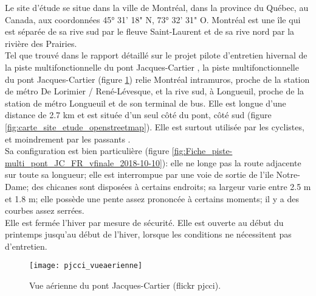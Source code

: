 ﻿\noindent Le site d'étude se situe dans la ville de Montréal, dans la province du Québec, au Canada, aux coordonnées 45° 31' 18" N, 73° 32' 31" O. Montréal est une île qui est séparée de sa rive sud par le fleuve Saint-Laurent et de sa rive nord par la rivière des Prairies.
\vspace{0.5\baselineskip}
\\
\noindent Tel que trouvé dans le rapport détaillé sur le projet pilote d'entretien hivernal de la piste multifonctionnelle du pont Jacques-Cartier \parencite{pjcci_rapport_2018}, la piste multifonctionnelle du pont Jacques-Cartier (figure \ref{fig:pjcci_vueaerienne}) relie Montréal intramuros, proche de la station de métro De Lorimier / René-Lévesque, et la rive sud, à Longueuil, proche de la station de métro Longueuil et de son terminal de bus. Elle est longue d'une distance de 2.7 km et est située d'un seul côté du pont, côté sud (figure \ref{fig:carte_site_etude_openstreetmap}). Elle est surtout utilisée par les cyclistes, et moindrement par les passants \parencite{pjcci_rapport_2018}.
\vspace{0.5\baselineskip}
\\
\noindent Sa configuration est bien particulière \parencite{pjcci_fiche_2018} (figure \ref{fig:Fiche_piste-multi_pont_JC_FR_vfinale_2018-10-10}): elle ne longe pas la route adjacente sur toute sa longueur; elle est interrompue par une voie de sortie de l'ile Notre-Dame; des chicanes sont disposées à certains endroits; sa largeur varie entre 2.5 m et 1.8 m; elle possède une pente assez prononcée à certains moments; il y a des courbes assez serrées.
\vspace{0.5\baselineskip}
\\
\noindent Elle est fermée l'hiver par mesure de sécurité. Elle est ouverte au début du printemps jusqu'au début de l'hiver, lorsque les conditions ne nécessitent pas d'entretien.
\begin{figure}[H]
    \centering
    \texttt{[image: pjcci\_vueaerienne]}
    \caption[Vue aérienne du pont Jacques-Cartier]{Vue aérienne du pont Jacques-Cartier (flickr \acrshort{pjcci})\protect\footnotemark.}
    \label{fig:pjcci_vueaerienne}
\end{figure}
